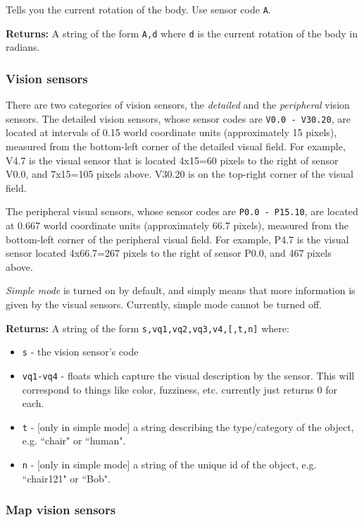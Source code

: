 Tells you the current rotation of the body. Use sensor code \texttt{A}.

\noindent \textbf{Returns:} A string of the form \texttt{A,d} where \texttt{d} is the current rotation of the body in radians.

\subsubsection{Vision sensors}

There are two categories of vision sensors, the \textit{detailed} and the \textit{peripheral} vision sensors. The detailed vision sensors, whose sensor codes are \texttt{V0.0 - V30.20}, are located at intervals of 0.15 world coordinate units (approximately 15 pixels), measured from the bottom-left corner of the detailed visual field. For example, V4.7 is the visual sensor that is located 4x15=60 pixels to the right of sensor V0.0, and 7x15=105 pixels above. V30.20 is on the top-right corner of the visual field.

The peripheral visual sensors, whose sensor codes are \texttt{P0.0 - P15.10}, are located at 0.667 world coordinate units (approximately 66.7 pixels), measured from the bottom-left corner of the peripheral visual field. For example, P4.7 is the visual sensor located 4x66.7=267 pixels to the right of sensor P0.0, and 467 pixels above.

\textit{Simple mode} is turned on by default, and simply means that more information is given by the visual sensors. Currently, simple mode cannot be turned off.

\noindent \textbf{Returns:} A string of the form \texttt{s,vq1,vq2,vq3,v4,[,t,n]} where:

\begin{itemize}
\item \texttt{s} - the vision sensor's code
\item \texttt{vq1-vq4} - floats which capture the visual description by the sensor. This will correspond to things like color, fuzziness, etc. currently just returns 0 for each.
\item \texttt{t} - [only in simple mode] a string describing the type/category of the object, e.g. ``chair" or ``human".
\item \texttt{n} - [only in simple mode] a string of the unique id of the object, e.g. ``chair121" or ``Bob".
\end{itemize}

\subsubsection{Map vision sensors}


